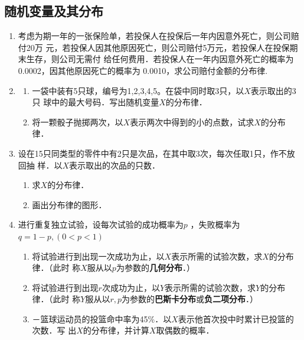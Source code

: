 \subsection{随机变量及其分布}

\begin{enumerate}

    \item 考虑为期一年的一张保险单，若投保人在投保后一年内因意外死亡，则公司赔付20万
    元，若投保人因其他原因死亡，则公司赔付5万元，若投保人在投保期末生存，则公司无需付
    给任何费用．若投保人在一年内因意外死亡的概率为0.0002，因其他原因死亡的概率为
    0.0010，求公司赔付金额的分布律.


    \item \begin{enumerate}
        \item 一袋中装有5只球，编号为1,2,3,4,5。在袋中同时取3只，以$X$表示取出的3只
        球中的最大号码．写出随机变量$X$的分布律．
        \item 将一颗骰子抛掷两次，以$X$表示两次中得到的小的点数，试求$X$的分布律．
    \end{enumerate}


    \item 设在15只同类型的零件中有2只是次品，在其中取3次，每次任取1只，作不放回抽
    样．以$X$表示取出的次品的只数．
    \begin{enumerate}
        \item 求$X$的分布律．
        \item 画出分布律的图形．
    \end{enumerate}



    \item 进行重复独立试验，设每次试验的成功概率为$p$ ，失败概率为$q=1-p,(0<p<1)$
    \begin{enumerate}
        \item 将试验进行到出现一次成功为止，以$X$表示所需的试验次数，求$X$的分布律．（此时
        称$X$服从以$p$为参数的\textbf{几何分布}．）
        \item 将试验进行到出现$r$次成功为止，以$Y$表示所需的试验次数，求$Y$的分布律．（此时
        称$Y$服从以$r,p$为参数的\textbf{巴斯卡分布}或\textbf{负二项分布}．）
        \item －篮球运动员的投篮命中率为45\%．以$X$表示他首次投中时累计已投篮的次数．写
        出$X$的分布律，并计算$X$取偶数的概率．
    \end{enumerate}



\end{enumerate}
